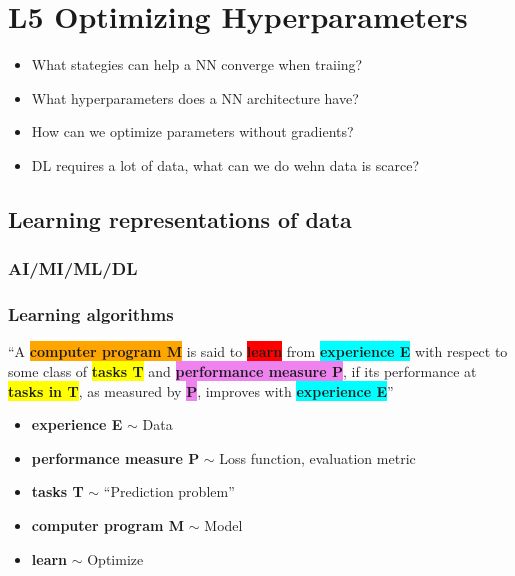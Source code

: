 \documentclass{article}
\begin{document}
\section{L5 Optimizing Hyperparameters}
\begin{summary}
    \begin{itemize}
        \item What stategies can help a NN converge when traiing?
        \item What hyperparameters does a NN architecture have?
        \item How can we optimize parameters without gradients? 
        \item DL requires a lot of data, what can we do wehn data is scarce?
    \end{itemize}
\end{summary}

\subsection{Learning representations of data}
\subsubsection{AI/MI/ML/DL}
\begin{definition}
\end{definition}
\subsubsection{Learning algorithms}
\begin{definition}
    \textquotedblleft A \colorbox{orange}{\textbf{computer program M}} is said to \colorbox{red}{\textbf{learn}} from \colorbox{cyan}{\textbf{experience E}} with respect to some class of \colorbox{yellow}{\textbf{tasks T}} and \colorbox{violet}{\textbf{performance measure P}}, if its performance at \colorbox{yellow}{\textbf{tasks in T}}, as measured by \colorbox{violet}{\textbf{P}}, improves with \colorbox{cyan}{\textbf{experience E}}\textquotedblright

\vspace{1em}

\noindent
\begin{itemize}
    \item \textbf{\color{cyan}experience E} $\sim$ Data
    \item \textbf{\color{violet}performance measure P} $\sim$ Loss function, evaluation metric
    \item \textbf{\color{yellow}tasks T} $\sim$ ``Prediction problem''
    \item \textbf{\color{orange}computer program M} $\sim$ Model
    \item \textbf{\color{red}learn} $\sim$ Optimize
\end{itemize}

\end{definition}
\end{document}
